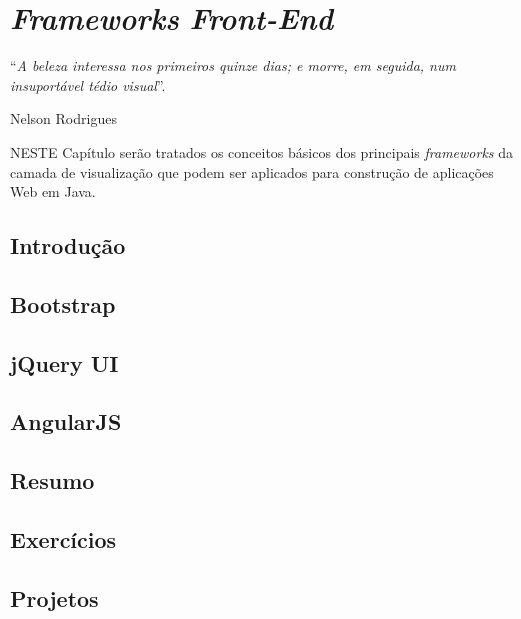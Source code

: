 \chapter{\textit{Frameworks} \textit{Front-End}}\label{cap:frameworksFront}
\epigraph{``\textit{A beleza interessa nos primeiros quinze dias; e morre, em seguida, num insuportável tédio visual}''.}{Nelson Rodrigues}

\lettrine[lines=4, lhang=0.1, lraise=0, loversize=0.2, findent=0.1em]{\textcolor{corAzulTema}{N}}{ESTE} Capítulo serão tratados os conceitos básicos dos principais \textit{frameworks} da camada de visualização que podem ser aplicados para construção de aplicações Web em Java.

\section{Introdução}

\section{Bootstrap}

\section{jQuery UI}

\section{AngularJS}

\section{Resumo}

\section{Exercícios}

\section{Projetos}
